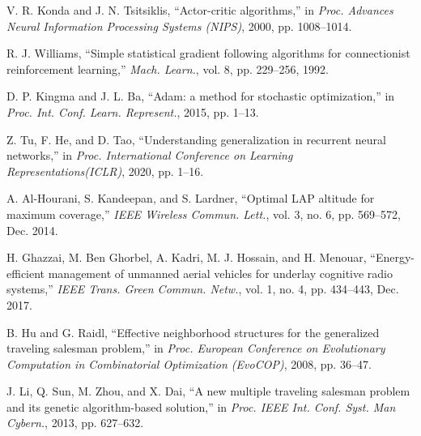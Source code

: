 \documentclass[journal]{IEEEtran}
\begin{document}
\begin{thebibliography}{1}
         V. R. Konda and J. N. Tsitsiklis, ``Actor-critic algorithms,'' in \emph{Proc. Advances Neural Information Processing Systems (NIPS)}, 2000, pp. 1008--1014.



         R. J. Williams, ``Simple statistical gradient following algorithms for connectionist reinforcement learning,'' \emph{Mach. Learn.}, vol. 8, pp. 229--256, 1992.

         D. P. Kingma and J. L. Ba, ``Adam: a method for stochastic optimization,'' in \emph{Proc. Int. Conf. Learn. Represent.}, 2015, pp. 1--13.


         Z. Tu, F. He, and D. Tao, ``Understanding generalization in recurrent neural networks,'' in \emph{Proc. International  Conference  on  Learning  Representations(ICLR)}, 2020, pp. 1--16.


          {A. Al-Hourani, S. Kandeepan, and S. Lardner, ``Optimal LAP altitude for maximum coverage,'' \emph{IEEE Wireless Commun. Lett.}, vol. 3, no. 6, pp. 569--572, Dec. 2014.}

         {H. Ghazzai, M. Ben Ghorbel, A. Kadri, M. J. Hossain, and H. Menouar, ``Energy-efficient management of unmanned aerial vehicles for underlay cognitive radio systems,'' \emph{ IEEE Trans. Green Commun. Netw.}, vol. 1, no. 4, pp. 434--443, Dec. 2017.}



          B. Hu and G. Raidl, ``Effective neighborhood structures for the generalized traveling salesman problem,'' in \emph{Proc. European Conference on Evolutionary Computation in Combinatorial Optimization (EvoCOP)}, 2008, pp. 36--47.


           J. Li, Q. Sun, M. Zhou, and X. Dai, ``A new multiple traveling salesman problem and its genetic algorithm-based solution,'' in \emph{Proc. IEEE Int. Conf. Syst. Man Cybern.}, 2013, pp. 627--632.



\end{thebibliography}



 
\end{document}
